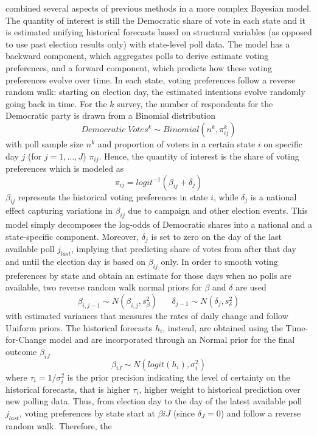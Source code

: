 \documentclass[
  12pt]{article}
\begin{document}
\citep{lin:2013} combined several aspects of previous methods in a more
complex Bayesian model. The quantity of interest is still the Democratic
share of vote in each state and it is estimated unifying historical
forecasts based on structural variables (as opposed to use past election
results only) with state-level poll data. The model has a backward
component, which aggregates polls to derive estimate voting preferences,
and a forward component, which predicts how these voting preferences
evolve over time. In each state, voting preferences follow a reverse
random walk: starting on election day, the estimated intentions evolve
randomly going back in time. For the \(k\) survey, the number of
respondents for the Democratic party is drawn from a Binomial
distribution \[Democratic \; Votes^k \sim Binomial(n^k, \pi_{ij}^k)\]
with poll sample size \(n^k\) and proportion of voters in a certain
state \(i\) on specific day \(j\) (for \(j = 1,...,J\)) \(\pi_{ij}\).
Hence, the quantity of interest is the share of voting preferences which
is modeled as \[\pi_{ij} = logit^{-1}(\beta_{ij} + \delta_j)\]
\(\beta_{ij}\) represents the historical voting preferences in state
\(i\), while \(\delta_j\) is a national effect capturing variations in
\(\beta_{ij}\) due to campaign and other election events. This model
simply decomposes the log-odds of Democratic shares into a national and
a state-specific component. Moreover, \(\delta_j\) is set to zero on the
day of the last available poll \(j_{last}\), implying that predicting
share of votes from after that day and until the election day is based
on \(\beta_{ij}\) only. In order to smooth voting preferences by state
and obtain an estimate for those days when no polls are available, two
reverse random walk normal priors for \(\beta\) and \(\delta\) are used
\[\beta_{i,j-1} \sim N(\beta_{i,j}, s^2_{\beta}) \;\;\;\;\;\; \delta_{j-1} \sim N(\delta_j, s^2_{\delta})\]
with estimated variances that measures the rates of daily change and
follow Uniform priors. The historical forecasts \(h_i\), instead, are
obtained using the \citet{abr:2008} Time-for-Change model and are
incorporated through an Normal prior for the final outcome
\(\beta_{iJ}\) \[\beta_{iJ} \sim N(logit(h_i), \sigma_i^2)\] where
\(\tau_i = 1 / \sigma_i^2\) is the prior precision indicating the level
of certainty on the historical forecasts, that is higher \(\tau_i\),
higher weight to historical prediction over new polling data. Thus, from
election day to the day of the latest available poll \(j_{last}\),
voting preferences by state start at \(\beta{iJ}\) (since
\(\delta_J = 0\)) and follow a reverse random walk. Therefore, the
\end{document}
